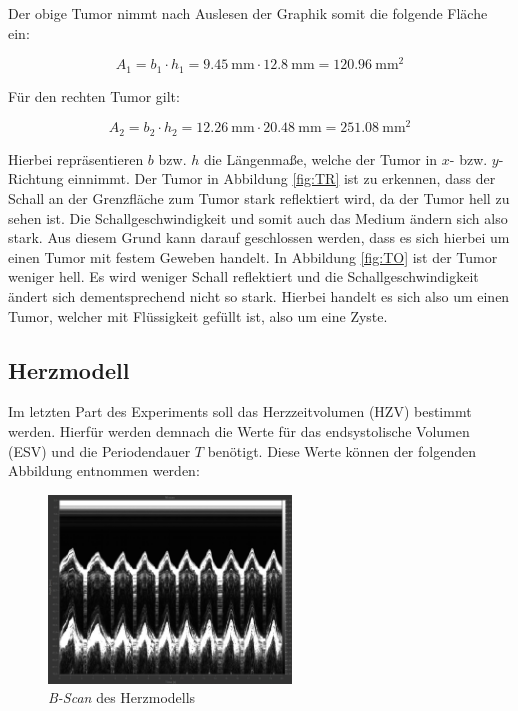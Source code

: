 \noindent Der obige Tumor nimmt nach Auslesen der Graphik somit die folgende Fläche ein:

\begin{equation*}
    A_1 = b_1\cdot h_1 = \qty{9.45}{\milli\meter}\cdot \qty{12.8}{\milli\meter} = \qty{120.96}{\milli\meter\squared}
\end{equation*}

\noindent Für den rechten Tumor gilt:

\begin{equation*}
    A_2 = b_2\cdot h_2 = \qty{12.26}{\milli\meter}\cdot \qty{20.48}{\milli\meter} = \qty{251.08}{\milli\meter\squared}
\end{equation*}

\noindent Hierbei repräsentieren $b$ bzw. $h$ die Längenmaße, welche der Tumor in $x$- bzw. $y$-Richtung einnimmt. 
Der Tumor in Abbildung \ref{fig:TR} ist zu erkennen, dass der Schall an der Grenzfläche zum Tumor stark reflektiert wird, da 
der Tumor hell zu sehen ist. Die Schallgeschwindigkeit und somit auch das Medium ändern sich also stark. Aus diesem Grund 
kann darauf geschlossen werden, dass es sich hierbei um einen Tumor mit festem Geweben handelt. In Abbildung \ref{fig:TO} ist 
der Tumor weniger hell. Es wird weniger Schall reflektiert und die Schallgeschwindigkeit ändert sich dementsprechend nicht so 
stark. Hierbei handelt es sich also um einen Tumor, welcher mit Flüssigkeit gefüllt ist, also um eine Zyste.

\subsection{Herzmodell}

\noindent Im letzten Part des Experiments soll das Herzzeitvolumen (HZV) bestimmt werden. Hierfür werden demnach 
die Werte für das endsystolische Volumen (ESV) und die Periodendauer $T$ benötigt. Diese Werte können der folgenden Abbildung 
entnommen werden:

\begin{figure}[H]
    \centering 
    \includegraphics[height=5cm]{content/Herzmodell.jpg}
    \caption{\emph{B-Scan} des Herzmodells}
    \label{fig:Herzmodell}
\end{figure}

